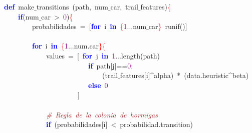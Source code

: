 \noindent
\mbox{}\textbf{\textcolor{Blue}{def}}\ make$\_$transitions\ \textcolor{BrickRed}{(}path\textcolor{BrickRed}{,}\ num$\_$car\textcolor{BrickRed}{,}\ trail$\_$features\textcolor{BrickRed}{)}\textcolor{Red}{\{} \\
\mbox{}\ \ \ \ \textbf{\textcolor{Blue}{if}}\textcolor{BrickRed}{(}num$\_$car\ \textcolor{BrickRed}{\textgreater{}}\ \textcolor{Purple}{0}\textcolor{BrickRed}{)}\textcolor{Red}{\{} \\
\mbox{}\ \ \ \ \ \ \ \ probabilidades\ \textcolor{BrickRed}{=}\ \textcolor{BrickRed}{[}\textbf{\textcolor{Blue}{for}}\ i\ \textbf{\textcolor{Blue}{in}}\ \textcolor{Red}{\{}\textcolor{Purple}{1}\textcolor{BrickRed}{...}num$\_$car\textcolor{Red}{\}}\ runif\textcolor{BrickRed}{()]} \\
\mbox{} \\
\mbox{}\ \ \ \ \ \ \ \ \textbf{\textcolor{Blue}{for}}\ i\ \textbf{\textcolor{Blue}{in}}\ \textcolor{Red}{\{}\textcolor{Purple}{1}\textcolor{BrickRed}{...}num\textcolor{BrickRed}{.}car\textcolor{Red}{\}\{} \\
\mbox{}\ \ \ \ \ \ \ \ \ \ \ \ values\ \textcolor{BrickRed}{=}\ \textcolor{BrickRed}{[}\ \textbf{\textcolor{Blue}{for}}\ j\ \textbf{\textcolor{Blue}{in}}\ \textcolor{Purple}{1}\textcolor{BrickRed}{...}length\textcolor{BrickRed}{(}path\textcolor{BrickRed}{)} \\
\mbox{}\ \ \ \ \ \ \ \ \ \ \ \ \ \ \ \ \ \ \ \ \ \ \ \ \textbf{\textcolor{Blue}{if}}\ path\textcolor{BrickRed}{[}j\textcolor{BrickRed}{]==}\textcolor{Purple}{0}\textcolor{BrickRed}{:} \\
\mbox{}\ \ \ \ \ \ \ \ \ \ \ \ \ \ \ \ \ \ \ \ \ \ \ \ \ \ \ \ \textcolor{BrickRed}{(}trail$\_$features\textcolor{BrickRed}{[}i\textcolor{BrickRed}{]\textasciicircum{}}alpha\textcolor{BrickRed}{)}\ \textcolor{BrickRed}{*}\ \textcolor{BrickRed}{(}data\textcolor{BrickRed}{.}heuristic\textcolor{BrickRed}{\textasciicircum{}}beta\textcolor{BrickRed}{)} \\
\mbox{}\ \ \ \ \ \ \ \ \ \ \ \ \ \ \ \ \ \ \ \ \ \ \ \ \textbf{\textcolor{Blue}{else}}\ \textcolor{Purple}{0} \\
\mbox{}\ \ \ \ \ \ \ \ \ \ \ \ \ \ \ \ \ \ \ \ \ \textcolor{BrickRed}{]} \\
\mbox{} \\
\mbox{}\ \ \ \ \ \ \ \ \ \ \ \ \textit{\textcolor{Brown}{\#\ Regla\ de\ la\ colonia\ de\ hormigas}} \\
\mbox{}\ \ \ \ \ \ \ \ \ \ \ \ \textbf{\textcolor{Blue}{if}}\ \textcolor{BrickRed}{(}probabilidades\textcolor{BrickRed}{[}i\textcolor{BrickRed}{]}\ \textcolor{BrickRed}{\textless{}}\ probabilidad\textcolor{BrickRed}{.}transition\textcolor{BrickRed}{)} \\
